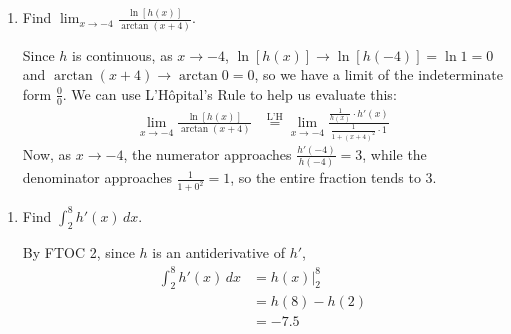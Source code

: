 \documentclass{article}
\begin{document}
\begin{enumerate}
\begin{enumerate}
  \item
    \begin{problem}[\vfill\newpage]
      Find $\displaystyle \lim_{x \to -4} \frac{\ln [h(x)]}{\arctan (x + 4)}$.
    \end{problem}

    \begin{solution}
      Since $h$ is continuous, as $x \to -4$, $\ln [h(x)] \to \ln [h(-4)]
      = \ln 1 = 0$ and $\arctan(x + 4) \to \arctan 0 = 0$, so we have a
      limit of the indeterminate form $\frac{0}{0}$.  We can use
      L'H\^opital's Rule to help us evaluate this:
      \begin{align*}
        \lim_{x \to -4} \frac{\ln [h(x)]}{\arctan (x + 4)} &
        \stackrel{\text{L'H}}{=} \lim_{x \to -4} \frac{\frac{1}{h(x)}
          \cdot h'(x)}{\frac{1}{1 + (x + 4)^2} \cdot 1}         
      \end{align*}
      Now, as $x \to -4$, the numerator approaches $\frac{h'(-4)}{h(-4)} =
      3$, while the denominator approaches $\frac{1}{1 + 0^2} = 1$, so the
      entire fraction tends to $\boxed{3}$. 
    \end{solution}

  \end{enumerate}


  \begin{enumerate}[resume]

  \item \label{spring2006-midterm2-part2-3a}
    \begin{problem}[\vfill]
      Find $\displaystyle \int_2^8 h'(x)\,dx$.
    \end{problem}

    \begin{solution}
      By FTOC 2, since $h$ is an antiderivative of $h'$,
      \begin{align*}
        \int_2^8 h'(x)\,dx &= h(x) \Big|_2^8 \\
        &= h(8) - h(2) \\
        &= \boxed{-7.5}
      \end{align*}
    \end{solution}


\end{enumerate}
\end{enumerate}
\end{document}
